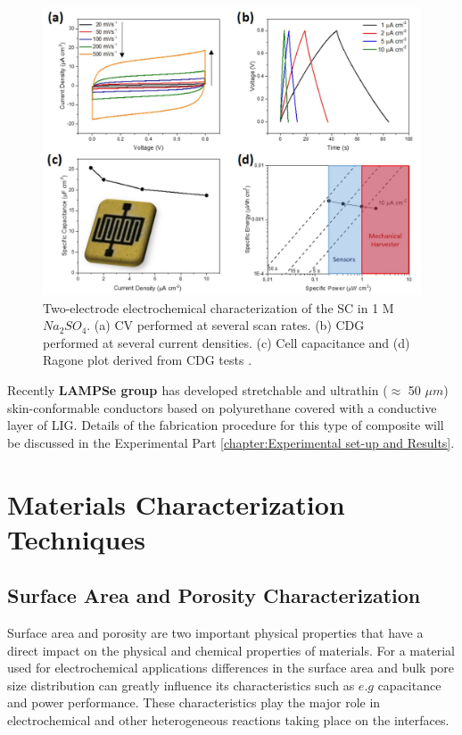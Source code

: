 \begin{figure}[H]
\centering
\includegraphics[width=1\textwidth]{Figures/Theory/Lamberti_PDMS_PI_2019.jpg}
\medskip
\captionsetup{width=0.95\linewidth}
\caption{Two-electrode electrochemical characterization of the SC in 1 M $Na_2SO_4$. (a) CV performed at several scan rates. (b) CDG performed at several current densities. (c) Cell capacitance and (d) Ragone plot derived from CDG tests \cite{parmeggiani_pdmspolyimide_2019}.}
\label{fig:Lamberti_PDMS_PI_2019}
\end{figure}

Recently \textbf{LAMPSe group \cite{dallinger_stretchable_2020}} has developed stretchable and ultrathin ($\approx$ 50 $\mu m$) skin-conformable conductors based on polyurethane covered with a conductive layer of LIG. Details of the fabrication procedure for this type of composite will be discussed in the Experimental Part \ref{chapter:Experimental set-up and Results}.  


\section{Materials Characterization Techniques}
\subsection{Surface Area and Porosity Characterization}

Surface area and porosity are two important physical properties that have a direct impact on the physical and chemical properties of materials. For a material used for electrochemical applications differences in the surface area and bulk pore size distribution can greatly influence its characteristics such as $e.g$ capacitance and power performance. These characteristics play the major role in electrochemical and other heterogeneous reactions taking place on the interfaces.

